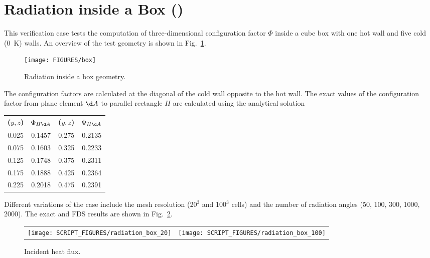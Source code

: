 \documentclass[11pt]{book}
\begin{document}
\section{Radiation inside a Box (\texorpdfstring{}{radiation\_box}) }
\label{radiation_in_a_box}
\label{radiation_box}

This verification case tests the computation of three-dimensional configuration factor $\Phi$ inside a cube box with one hot wall and five cold (0~K) walls. An overview of the test geometry is shown in Fig.~\ref{fig_box_radiation}.
\begin{figure}[ht]
\centering
\texttt{[image: FIGURES/box]}
\caption[Radiation inside a box geometry]{\label{fig_box_radiation} Radiation inside a box geometry.}
\end{figure}
The configuration factors are calculated at the diagonal of the cold wall opposite to the hot wall. The exact values of the configuration factor from plane element $\d A$ to parallel rectangle $H$ are calculated using the analytical solution~\cite{Siegel:1}
\begin{center}
\begin{tabular}{|c|c|c|c|}
\hline ($y,z$) & $\Phi_{H \d A}$ & ($y,z$) & $\Phi_{H \d A}$ \\ \hline \hline
0.025   &0.1457 & 0.275 &0.2135 \\
0.075   &0.1603 & 0.325 &0.2233 \\
0.125   &0.1748 & 0.375 &0.2311 \\
0.175   &0.1888 & 0.425 &0.2364 \\
0.225   &0.2018 & 0.475 &0.2391 \\ \hline
\end{tabular}
\end{center}
Different variations of the case include the mesh resolution (20$^3$ and 100$^3$ cells) and the number of radiation angles (50, 100, 300, 1000, 2000). The exact and FDS results are shown in Fig.~\ref{fig_incident_heat_flux}.

\begin{figure}[ht]
\centering
\begin{tabular*}{\textwidth}{lr}
\texttt{[image: SCRIPT\_FIGURES/radiation\_box\_20]} &
\texttt{[image: SCRIPT\_FIGURES/radiation\_box\_100]}
\end{tabular*}
\caption[Incident heat flux]{Incident heat flux.}\label{fig_incident_heat_flux}
\end{figure}
\end{document}
